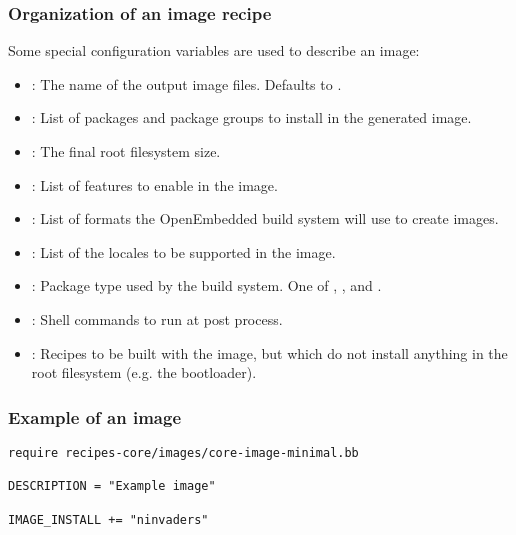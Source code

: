 \begin{frame}
  \frametitle{Organization of an image recipe}
  Some special configuration variables are used to describe an image:
      \begin{itemize}
        \item {}: The name of the output image files.
          Defaults to .
        \item {}: List of packages and package groups to
          install in the generated image.
        \item {}: The final root filesystem size.
        \item {}: List of features to enable in the
          image.
        \item {}: List of formats the OpenEmbedded build
          system will use to create images.
        \item {}: List of the locales to be supported in
          the image.
        \item {}: Package type used by the build system.
          One of , ,  and .
        \item {}: Shell commands to run at
          post process.
        \item {}: Recipes to be built with the image, but
          which do not install anything in the root filesystem
          (e.g. the bootloader).
      \end{itemize}
\end{frame}

\begin{frame}[fragile]
  \frametitle{Example of an image}
  \begin{block}{}
    \begin{verbatim}
require recipes-core/images/core-image-minimal.bb

DESCRIPTION = "Example image"

IMAGE_INSTALL += "ninvaders"
    \end{verbatim}
  \end{block}
\end{frame}

